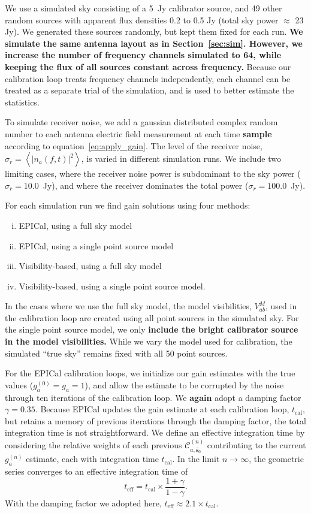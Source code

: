 \documentclass[a4paper,fleqn,usenatbib]{../mnras}
\newcommand{\spix}{\ensuremath{\hat{\mathbf{s}}_{0}}}
\newcommand{\Cna}[1][n]{\ensuremath{\mathcal{C}^{(#1)}_{a,\spix}}}
\newcommand{\damp}{\ensuremath{\gamma}}
\newcommand{\tcal}{\ensuremath{t_{\mathrm{cal}}}}
\newcommand{\teff}{\ensuremath{t_{\mathrm{eff}}}}
\begin{document}
We use a simulated sky consisting of a 5~Jy calibrator source, and 49 other random sources 
with apparent flux densities 0.2 to 0.5 Jy (total sky power $\approx$ 23 Jy). We generated 
these sources randomly, but kept them fixed for each run. 
\textbf{We simulate the same antenna layout as in Section~\ref{sec:sim}. 
However, we increase the number of frequency channels simulated to 64, while keeping the flux of all sources constant across frequency.}
Because our calibration loop treats 
frequency channels independently, each channel can be treated as a separate trial of the 
simulation, and is used to better estimate the statistics.

To simulate receiver noise, we add a gaussian distributed complex random number to each 
antenna electric field measurement at each time \textbf{sample} according to 
equation~\ref{eq:apply_gain}. The level of the receiver noise, $\sigma_r = \left<\left|
n_a(f,t)\right|^2\right>$, is varied in different simulation runs. We include two limiting 
cases, where the receiver noise power is subdominant to the sky power ($\sigma_r = 
10.0$~Jy), and where the receiver dominates the total power ($\sigma_r=100.0$~Jy).

For each simulation run we find gain solutions using four methods:
\begin{enumerate}[i.]
\item EPICal, using a full sky model
\item EPICal, using a single point source model
\item Visibility-based, using a full sky model
\item Visibility-based, using a single point source model.
\end{enumerate}
In the cases where we use the full sky model, the model visibilities, $V^M_{ab}$, used in the 
calibration loop are created using all point sources in the simulated sky. For the single point 
source model, we only \textbf{include the bright calibrator source in the model visibilities.}
While we vary the model used for calibration, the simulated ``true sky'' remains fixed with all 50 
point sources.

For the EPICal calibration loops, we initialize our gain estimates with the true values 
(${g^{(0)}_a=g_a=1}$), and allow the estimate to be corrupted by the noise through ten 
iterations of the calibration loop. We \textbf{again} adopt a damping factor $\damp=0.35$. Because EPICal 
updates the gain estimate at each calibration loop, \tcal, but retains a memory of previous 
iterations through the damping factor, the total integration time is not straightforward. We define 
an effective integration time by considering the relative weights of each previous $\Cna$ 
contributing to the current $g^{(n)}_a$ estimate, each with integration time \tcal. In the limit $n
\rightarrow \infty$, the geometric series converges to an effective integration time of
\begin{equation}
\teff = \tcal \times \frac{1+\damp}{1-\damp}.
\end{equation}
With the damping factor we adopted here, $\teff \approx 2.1 \times \tcal$. 
\end{document}
